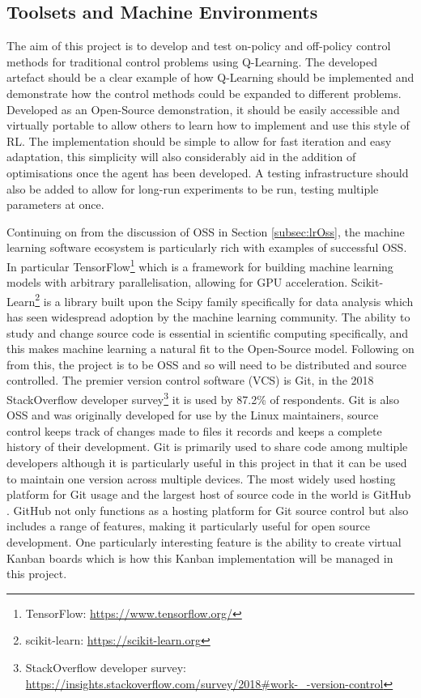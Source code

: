 \documentclass[hidelinks,journal]{IEEEtran}
\begin{document}
\subsection{Toolsets and Machine Environments}
\label{subsec:mthdTools}
The aim of this project is to develop and test on-policy and off-policy control methods for traditional control problems using Q-Learning. The developed artefact should be a clear example of how Q-Learning should be implemented and demonstrate how the control methods could be expanded to different problems. Developed as an Open-Source demonstration, it should be easily accessible and virtually portable to allow others to learn how to implement and use this style of RL. The implementation should be simple to allow for fast iteration and easy adaptation, this simplicity will also considerably aid in the addition of optimisations once the agent has been developed. A testing infrastructure should also be added to allow for long-run experiments to be run, testing  multiple parameters at once. 

Continuing on from the discussion of OSS in Section \ref{subsec:lrOss}, the machine learning software ecosystem is particularly rich with examples of successful OSS. In particular TensorFlow\footnote{TensorFlow: \url{https://www.tensorflow.org/}} which is a framework for building machine learning models with arbitrary parallelisation, allowing for GPU acceleration. Scikit-Learn\footnote{scikit-learn: \url{https://scikit-learn.org}} is a library built upon the Scipy family specifically for data analysis which has seen widespread adoption by the machine learning community. The ability to study and change source code is essential in scientific computing specifically, and this makes machine learning a natural fit to the Open-Source model. Following on from this, the project is to be OSS and so will need to be distributed and source controlled. The premier version control software (VCS) is Git, in the 2018 StackOverflow developer survey\footnote{StackOverflow developer survey: \url{https://insights.stackoverflow.com/survey/2018\#work-_-version-control}} it is used by 87.2\% of respondents. Git is also OSS and was originally developed for use by the Linux maintainers, source control keeps track of changes made to files it records and keeps a complete history of their development. Git is primarily used to share code among multiple developers although it is particularly useful in this project in that it can be used to maintain one version across multiple devices. The most widely used hosting platform for Git usage and the largest host of source code in the world is GitHub \parencite{Gousios14}. GitHub not only functions as a hosting platform for Git source control but also includes a range of features, making it particularly useful for open source development. One particularly interesting feature is the ability to create virtual Kanban boards which is how this Kanban implementation will be managed in this project.
\end{document}
